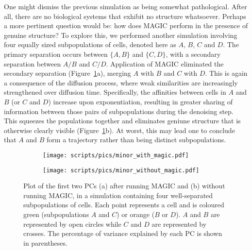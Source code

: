 \documentclass[10pt,letterpaper]{article}
\begin{document}
One might dismiss the previous simulation as being somewhat pathological.
After all, there are no biological systems that exhibit no structure whatsoever.
Perhaps a more pertinent question would be: how does MAGIC perform in the presence of genuine structure? 
To explore this, we performed another simulation involving four equally sized subpopulations of cells, denoted here as $A$, $B$, $C$ and $D$.
The primary separation occurs between $\{A, B\}$ and $\{C, D\}$, with a secondary separation between $A/B$ and $C/D$.
Application of MAGIC eliminated the secondary separation (Figure~\ref{fig:fourclusters}a), merging $A$ with $B$ and $C$ with $D$.
This is again a consequence of the diffusion process, where weak similarities are increasingly strengthened over diffusion time.
Specifically, the affinities between cells in $A$ and $B$ (or $C$ and $D$) increase upon exponentiation,
resulting in greater sharing of information between those pairs of subpopulations during the denoising step.
This squeezes the populations together and eliminates geniune structure that is otherwise clearly visible (Figure~\ref{fig:fourclusters}b).
At worst, this may lead one to conclude that $A$ and $B$ form a trajectory rather than being distinct subpopulations.

\begin{figure}[btp]
\centering
\begin{subfigure}[b]{0.49\textwidth}
    \texttt{[image: scripts/pics/minor\_with\_magic.pdf]}
    \caption{}
\end{subfigure}
\begin{subfigure}[b]{0.49\textwidth}
    \texttt{[image: scripts/pics/minor\_without\_magic.pdf]}
    \caption{}
\end{subfigure}
\caption{Plot of the first two PCs (a) after running MAGIC and (b) without running MAGIC, in a simulation containing four well-separated subpopulations of cells.
Each point represents a cell and is coloured green (subpopulations $A$ and $C$) or orange ($B$ or $D$).
$A$ and $B$ are represented by open circles while $C$ and $D$ are represented by crosses.
The percentage of variance explained by each PC is shown in parentheses.}
\label{fig:fourclusters}
\end{figure}
\end{document}

